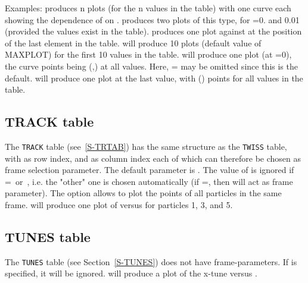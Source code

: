 Examples:
produces n plots (for the n  values in the table)
with one curve each showing the dependence of  on .
produces two plots of this type, for =0. and 0.01
(provided the  values exist in the table).
produces one plot  against  at the position
of the last element in the table.
will produce 10 plots (default value of MAXPLOT)
for the first 10  values in the table.
will produce one plot (at =0),
the curve points being (,) at all  values.
Here, = may be omitted
since this is the default.
will produce one plot at the last  value,
with () points for all  values
in the table.

\subsection{TRACK table}
The {\tt TRACK} table (see~\ref{S-TRTAB})
has the same structure as the {\tt TWISS} table, with
 as row index, and  as column index
each of which can therefore be chosen as frame selection parameter.
The default parameter is .
The value of  is ignored if
=~or~,
i.e. the "other" one is chosen
automatically (if =,
then  will act as frame parameter).
The option
 allows to plot the points of all particles in the
same frame.
will produce one plot of  versus  for particles
1, 3, and 5.

\subsection{TUNES table}
The {\tt TUNES} table
(see Section~\ref{S-TUNES})
does not have frame-parameters.
If  is specified, it will be ignored.
will produce a plot of the x-tune versus .


